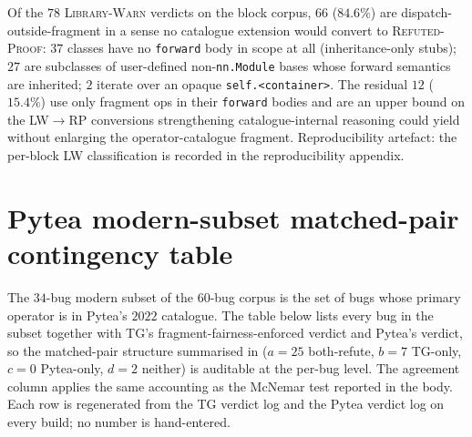 Of the $78$ \textsc{Library-Warn} verdicts on the block corpus,
$66$ ($84.6\%$) are dispatch-outside-fragment in a sense no
catalogue extension would convert to \textsc{Refuted-Proof}:
$37$ classes have no \texttt{forward} body in scope at all
(inheritance-only stubs);
$27$ are subclasses of user-defined non-\texttt{nn.Module} bases
whose forward semantics are inherited;
$2$ iterate over an opaque \texttt{self.<container>}.
The residual $12$ ($15.4\%$) use only fragment ops in their
\texttt{forward} bodies and are an upper bound on the
\textsc{LW}$\to$\textsc{RP} conversions strengthening
catalogue-internal reasoning could yield without enlarging the
operator-catalogue fragment. Reproducibility artefact:
the per-block LW classification is recorded in the
reproducibility appendix.

\section{Pytea modern-subset matched-pair contingency table}
\label{app:pytea-mcnemar}

The $34$-bug modern subset of the $60$-bug corpus is the set of
bugs whose primary operator is in Pytea's $2022$ catalogue. The
table below lists every bug in the subset together with
\textsc{TG}'s fragment-fairness-enforced verdict and Pytea's
verdict, so the matched-pair structure summarised in
 ($a{=}25$ both-refute, $b{=}7$
TG-only, $c{=}0$ Pytea-only, $d{=}2$ neither) is auditable at
the per-bug level. The agreement column applies the same
accounting as the McNemar test reported in the body. Each row is
regenerated from the \textsc{TG} verdict log and the Pytea
verdict log on every build; no number is hand-entered.

